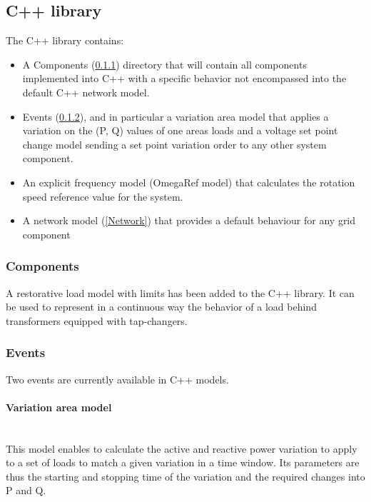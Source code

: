 \documentclass[a4paper, 12pt]{report}
\begin{document}


\subsection{C++ library}

The C++ library contains:
\begin{itemize}
\item A Components (\ref{Components}) directory that will contain all components implemented into C++ with a specific behavior not encompassed into the default C++ network model.
\item Events (\ref{Events}), and in particular a variation area model that applies a variation on the (P, Q) values of one area\textquotesingle s loads and a voltage set point change model sending a set point variation order to any other system component.
\item An explicit  frequency model (OmegaRef model) that calculates the rotation speed reference value for the system.
\item A network model (\ref{Network}) that provides a default behaviour for any grid component
\end{itemize}

\subsubsection{Components}
\label{Components}

A restorative load model with limits has been added to the C++ library. It can be used to represent in a continuous way the behavior of a load behind transformers equipped with tap-changers.

\subsubsection{Events}
\label{Events}

Two events are currently available in C++ models.

\paragraph{Variation area model}
~~\\

This model enables to calculate the active and reactive power variation to apply to a set of loads to match a given variation in a time window. Its parameters are thus the starting and stopping time of the variation and the required changes into P and Q.
\end{document}
